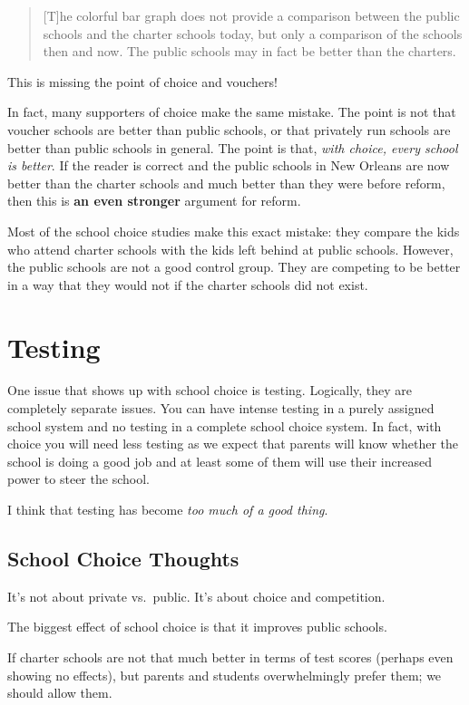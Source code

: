 \begin{quote}
    [T]he colorful bar graph does not provide a comparison between the public
    schools and the charter schools today, but only a comparison of the schools
    then and now. The public schools may in fact be better than the charters.
\end{quote}

This is missing the point of choice and vouchers!

In fact, many supporters of choice make the same mistake. The point is not that
voucher schools are better than public schools, or that privately run schools
are better than public schools in general. The point is that, \emph{with
choice, every school is better}. If the reader is correct and the public
schools in New Orleans are now better than the charter schools and much better
than they were before reform, then this is \textbf{an even stronger} argument
for reform.

Most of the school choice studies make this exact mistake: they compare the
kids who attend charter schools with the kids left behind at public schools.
However, the public schools are not a good control group. They are competing to
be better in a way that they would not if the charter schools did not exist.

\section{Testing}

One issue that shows up with school choice is testing. Logically, they are
completely separate issues. You can have intense testing in a purely assigned
school system and no testing in a complete school choice system. In fact, with
choice you will need less testing as we expect that parents will know whether
the school is doing a good job and at least some of them will use their
increased power to steer the school.

I think that testing has become \emph{too much of a good thing}.

\subsection{School Choice Thoughts}

\thought It's not about private vs.\ public. It's about choice and competition.

\thought The biggest effect of school choice is that it improves public schools.

\thought If charter schools are not that much better in terms of test scores
(perhaps even showing no effects), but parents and students overwhelmingly
prefer them; we should allow them.

